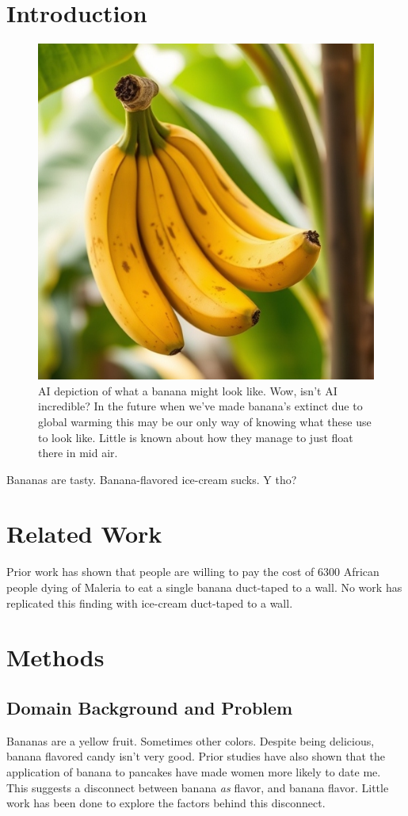 \documentclass[oneside,openany]{report}
\let\Oldsection\section
\renewcommand{\section}{\FloatBarrier\Oldsection}
\let\Oldsubsection\subsection
\renewcommand{\subsection}{\FloatBarrier\Oldsubsection}
\begin{document}
\section{Introduction}
\label{sec:chapter1_introduction}

\begin{figure}[ht]
 \centering 
 \includegraphics[width=.5\textwidth]{pictures/real_banana.jpeg}
 \caption[Short text maybe useful for the future when descriptions actually work better for accessibility]{AI depiction of what a banana might look like. Wow, isn't AI incredible? In the future when we've made banana's extinct due to global warming this may be our only way of knowing what these use to look like. Little is known about how they manage to just float there in mid air.}
 \label{fig:banananananananana}
\end{figure}

Bananas are tasty. Banana-flavored ice-cream sucks. Y tho?


\section{Related Work}
\label{sec:chapter1_related_work}
Prior work has shown that people are willing to pay the cost of 6300 African people dying of Maleria to eat a single banana duct-taped to a wall. No work has replicated this finding with ice-cream duct-taped to a wall.

 
\section{Methods}
\subsection{Domain Background and Problem}
Bananas are a yellow fruit. Sometimes other colors. Despite being delicious, banana flavored candy isn't very good. Prior studies have also shown that the application of banana to pancakes have made women more likely to date me. This suggests a disconnect between banana \emph{as} flavor, and banana flavor. Little work has been done to explore the factors behind this disconnect.
\end{document}
